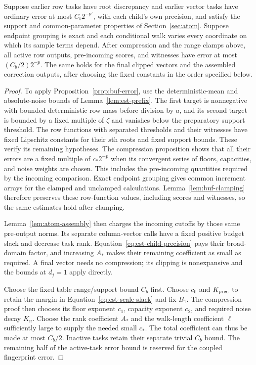 \begin{proposition}\label{prop:est-clean}
Suppose earlier row tasks have root discrepancy and earlier vector
tasks have ordinary error at most $C_b2^{-p'}$, with each child's own
precision, and satisfy the support and common-parameter properties of
Section~\ref{sec:atom}. Suppose endpoint grouping is exact and each
conditional walk varies every coordinate on which its sample terms
depend.  After compression and the range clamps above, all
active row outputs, pre-incoming scores, and witnesses have error at most
$(C_b/2)2^{-p}$.  The same holds for the final clipped vectors and the
assembled correction outputs, after choosing the fixed constants in the
order specified below.
\end{proposition}
\begin{proof}
To apply Proposition~\ref{prop:buf-error}, use the deterministic-mean and
absolute-noise bounds of Lemma~\ref{lem:est-prefix}.  The first target
is nonnegative with bounded deterministic row mass before division by
$a$, and its second target is bounded by a fixed multiple of $\zeta$ and
vanishes below the preparatory support threshold.  The row
functions with separated thresholds and their witnesses have fixed Lipschitz constants for their $s$th roots and
fixed support bounds.  These verify its remaining hypotheses.  The
compression proposition shows that all their errors are a fixed multiple
of $c_*2^{-p}$ when its convergent series of
floors, capacities, and noise weights are chosen.  This includes the
pre-incoming quantities required by the incoming comparison.
Exact endpoint grouping gives common increment arrays for the clamped
and unclamped calculations.  Lemma~\ref{lem:buf-clamping} therefore
preserves these row-function values, including scores and witnesses,
so the same estimates hold after clamping.

Lemma~\ref{lem:atom-assembly} then charges the incoming cutoffs by those
same pre-output norms.  Its separate column-vector calls have a fixed
positive budget slack and decrease task rank.  Equation~\eqref{eq:est-child-precision}
pays their broad-domain factor, and increasing $A_*$ makes their remaining
coefficient as small as required.  A final vector needs no compression;
its clipping is nonexpansive and the bounds at $d_j=1$ apply directly.

Choose the fixed table range/support bound $C_b$ first.  Choose $c_0$ and
$K_{\rm prec}$ to retain the margin in Equation~\eqref{eq:est-scale-slack}
and fix $B_1$.  The
compression proof then chooses its floor exponent $c_1$, capacity exponent
$c_2$, and required noise decay $K_n$.  Choose the rank coefficient $A_*$ and the walk-length
coefficient $\ell$ sufficiently large to supply the needed small $c_*$.  The total
coefficient can thus be made at most $C_b/2$.  Inactive tasks retain their
separate trivial $C_b$ bound.  The remaining half of the active-task
error bound is reserved for the coupled fingerprint error.
\end{proof}

